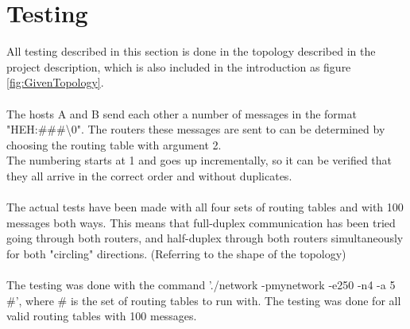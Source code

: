 \section{Testing}
All testing described in this section is done in the topology described in the project description, which is also included in the introduction as figure \ref{fig:GivenTopology}.\\
\\
The hosts A and B send each other a number of messages in the format "HEH:\#\#\#\textbackslash0". The routers these messages are sent to can be determined by choosing the routing table with argument 2.\\
The numbering starts at 1 and goes up incrementally, so it can be verified that they all arrive in the correct order and without duplicates.\\
\\
The actual tests have been made with all four sets of routing tables and with 100 messages both ways. This means that full-duplex communication has been tried going through both routers, and half-duplex through both routers simultaneously for both "circling" directions. (Referring to the shape of the topology)\\
\\
The testing was done with the command './network -pmynetwork -e250 -n4 -a 5 \#', where \# is the set of routing tables to run with. The testing was done for all valid routing tables with 100 messages.\\
\\
